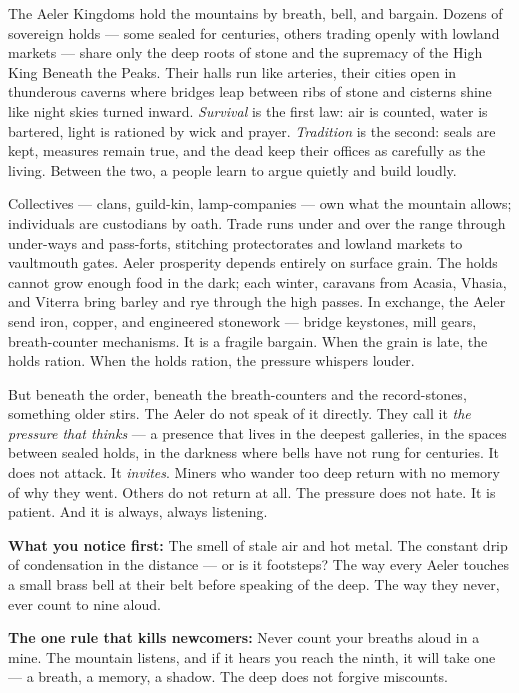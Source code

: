 \vspace{2mm}
\begin{tcolorbox}[colback=black!3,colframe=blue!60!black,title={Theme \& Atmosphere},breakable]
The Aeler Kingdoms hold the mountains by breath, bell, and bargain. Dozens of sovereign holds --- some sealed for centuries, others trading openly with lowland markets --- share only the deep roots of stone and the supremacy of the High King Beneath the Peaks. Their halls run like arteries, their cities open in thunderous caverns where bridges leap between ribs of stone and cisterns shine like night skies turned inward. \textit{Survival} is the first law: air is counted, water is bartered, light is rationed by wick and prayer. \textit{Tradition} is the second: seals are kept, measures remain true, and the dead keep their offices as carefully as the living. Between the two, a people learn to argue quietly and build loudly.

Collectives --- clans, guild-kin, lamp-companies --- own what the mountain allows; individuals are custodians by oath. Trade runs under and over the range through under-ways and pass-forts, stitching protectorates and lowland markets to vaultmouth gates. Aeler prosperity depends entirely on surface grain. The holds cannot grow enough food in the dark; each winter, caravans from Acasia, Vhasia, and Viterra bring barley and rye through the high passes. In exchange, the Aeler send iron, copper, and engineered stonework --- bridge keystones, mill gears, breath-counter mechanisms. It is a fragile bargain. When the grain is late, the holds ration. When the holds ration, the pressure whispers louder.

But beneath the order, beneath the breath-counters and the record-stones, something older stirs. The Aeler do not speak of it directly. They call it \emph{the pressure that thinks} --- a presence that lives in the deepest galleries, in the spaces between sealed holds, in the darkness where bells have not rung for centuries. It does not attack. It \emph{invites}. Miners who wander too deep return with no memory of why they went. Others do not return at all. The pressure does not hate. It is patient. And it is always, always listening.

\vspace{2mm}
\textbf{What you notice first:} The smell of stale air and hot metal. The constant drip of condensation in the distance --- or is it footsteps? The way every Aeler touches a small brass bell at their belt before speaking of the deep. The way they never, ever count to nine aloud.

\textbf{The one rule that kills newcomers:} Never count your breaths aloud in a mine. The mountain listens, and if it hears you reach the ninth, it will take one --- a breath, a memory, a shadow. The deep does not forgive miscounts.
\end{tcolorbox}

